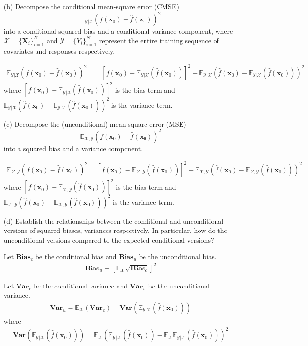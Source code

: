 \documentclass[10pt]{article}
\theoremstyle{definition}
\theoremstyle{remark}
\newcommand{\bx}{\bm{x}}
\newcommand{\bX}{\bm{X}}
\newcommand{\bbE}{\mathbb{E}}
\newcommand{\cX}{\mathcal{X}}
\newcommand{\cY}{\mathcal{Y}}
\newcommand{\bvar}{\textbf{Var}}
\newcommand{\bbias}{\textbf{Bias}}
\begin{document}
\begin{enumerate}
\begin{itemize}
		\item [(b)] Decompose the conditional mean-square error (CMSE)
		\[ \bbE_{\cY|\cX}\left( f(\bx_{0}) - \hat{f}(\bx_{0}) \right)^{2}  \]
		into a conditional squared bias and a conditional variance component, where $ \cX = \{ \bX_{i} \}_{i=1}^{N} $ and $ \cY = \{ Y_{i} \}_{i=1}^{N} $ represent the entire training sequence of covariates and responses respectively.
		
		\begin{align*}
		    \bbE_{\cY|\cX}\left( f(\bx_{0}) - \hat{f}(\bx_{0}) \right)^{2}& = \left[ f(\bx_{0}) - \bbE_{\cY|\cX}\left(\hat{f}(\bx_{0})\right) \right]^{2} + \bbE_{\cY|\cX}\left( \hat{f}(\bx_{0}) - \bbE_{\cY|\cX}\left(\hat{f}(\bx_{0})\right) \right)^2 
		\end{align*}
		where $ \left[ f(\bx_{0}) - \bbE_{\cY|\cX}\left(\hat{f}(\bx_{0})\right) \right]^{2} $ is the bias term and $ \bbE_{\cY|\cX}\left( \hat{f}(\bx_{0}) - \bbE_{\cY|\cX}\left(\hat{f}(\bx_{0})\right) \right)^2 $ is the variance term.
		
		\item [(c)] Decompose the (unconditional) mean-square error (MSE)
		\[ \bbE_{\cX,\cY}\left( f(\bx_{0}) - \hat{f}(\bx_{0}) \right)^{2}  \]
		into a squared bias and a variance component.
		
		\begin{align*}
		    \bbE_{\cX,\cY}\left( f(\bx_{0}) - \hat{f}(\bx_{0}) \right)^{2} = \left[ f(\bx_{0}) - \bbE_{\cX,\cY}\left(\hat{f}(\bx_{0})\right) \right]^{2} + \bbE_{\cX,\cY}\left( \hat{f}(\bx_{0}) - \bbE_{\cX,\cY}\left(\hat{f}(\bx_{0})\right) \right)^2 
		\end{align*}
		where $ \left[ f(\bx_{0}) - \bbE_{\cX,\cY}\left(\hat{f}(\bx_{0})\right) \right]^{2} $ is the bias term and $ \bbE_{\cX,\cY}\left( \hat{f}(\bx_{0}) - \bbE_{\cX,\cY}\left(\hat{f}(\bx_{0})\right) \right)^2 $ is the variance term.
		
		\item [(d)] Establish the relationships between the conditional and unconditional versions of squared biases, variances respectively. In particular, how do the unconditional versions compared to the expected conditional versions?
		
		Let $\bbias_c$ be the conditional bias and $ \bbias_u $ be the unconditional bias.
		\begin{align*}
		    \bbias_u = \left[ \bbE_{\cX}\sqrt{\bbias_c} \right]^2
		\end{align*}
		
		Let $\bvar_c$ be the conditional variance and $ \bvar_u $ be the unconditional variance.
		\begin{align*}
		    \bvar_u =  \bbE_{\cX}\left(\bvar_c\right) + \bvar\left( \bbE_{\cY|\cX}\left(\hat{f}(\bx_{0})\right) \right)
		\end{align*}
		where
		\begin{align*}
		    \bvar\left( \bbE_{\cY|\cX}\left(\hat{f}(\bx_{0})\right) \right) = \bbE_{\cX}\left( \bbE_{\cY|\cX}\left(\hat{f}(\bx_{0})\right) - \bbE_{\cX}\bbE_{\cY|\cX}\left(\hat{f}(\bx_{0})\right) \right)^2
		\end{align*}
	\end{itemize}
	

\end{enumerate}
\end{document}
